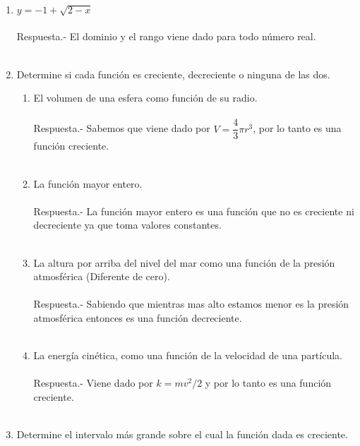 \begin{enumerate}[\bfseries 1.]
\item $y=-1+\sqrt{2-x}$\\\\
    Respuesta.-\; El dominio y el rango viene dado para todo número real.\\\\

\item Determine si cada función es creciente, decreciente o ninguna de las dos.

\begin{enumerate}[\bfseries a)]

    \item El volumen de una esfera como función de su radio.\\\\
	Respuesta.-\; Sabemos que viene dado por $V=\dfrac{4}{3}\pi r^3$, por lo tanto es una función creciente.\\\\

    \item La función mayor entero.\\\\
	Respuesta.-\; La función mayor entero es una función que no es creciente ni decreciente ya que toma valores constantes.\\\\

    \item La altura por arriba del nivel del mar como una función de la presión atmosférica (Diferente de cero).\\\\
	Respuesta.-\; Sabiendo que mientras mas alto estamos menor es la presión atmosférica entonces es una función decreciente.\\\\

    \item La energía cinética, como una función de la velocidad de una partícula.\\\\
	Respuesta.-\; Viene dado por $k=mv^2/2$ y por lo tanto es una función creciente.\\\\

\end{enumerate}

\item Determine el intervalo más grande sobre el cual la función dada es creciente.
\begin{enumerate}[\bfseries a)]


\end{enumerate}
\end{enumerate}
